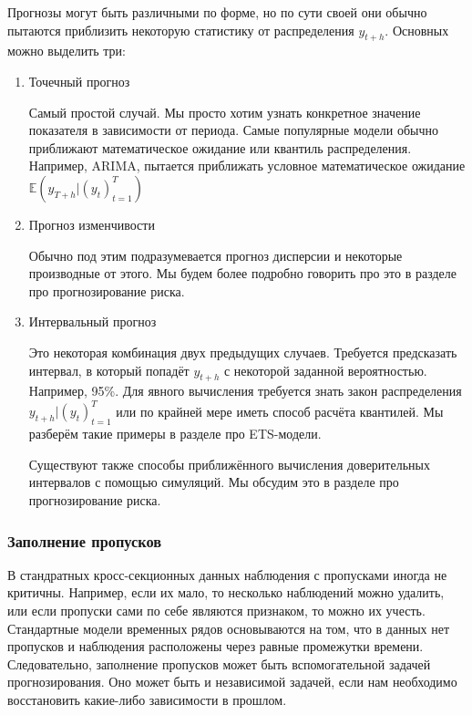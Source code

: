\documentclass[12pt,fleqn]{article}
\begin{document}
Прогнозы могут быть различными по форме, но по сути своей они обычно пытаются приблизить некоторую статистику от распределения $y_{t+h}$. Основных можно выделить три:

\begin{enumerate}
	\item Точечный прогноз
	
	Самый простой случай. Мы просто хотим узнать конкретное значение показателя в зависимости от периода. Самые популярные модели обычно приближают математическое ожидание или квантиль распределения. Например, ARIMA, пытается приближать условное математическое ожидание $\mathbb{E}(y_{T+h} | (y_t)_{t=1}^{T})$	
	
	
	\item Прогноз изменчивости
	
	Обычно под этим подразумевается прогноз дисперсии и некоторые производные от этого. Мы будем более подробно говорить про это в разделе про прогнозирование риска.
	
	\item Интервальный прогноз
	
	Это некоторая комбинация двух предыдущих случаев. Требуется предсказать интервал, в который попадёт $y_{t+h}$ с некоторой заданной вероятностью. Например, 95\%. Для явного вычисления требуется знать закон распределения $y_{t+h}  | (y_t)_{t=1}^{T}$ или по крайней мере иметь способ расчёта квантилей. Мы разберём такие примеры в разделе про ETS-модели. 
	
	Существуют также способы приближённого вычисления доверительных интервалов с помощью симуляций. Мы обсудим это в разделе про прогнозирование риска.
	
\end{enumerate}

\subsubsection{Заполнение пропусков}

В стандратных кросс-секционных данных наблюдения с пропусками иногда не критичны. Например, если их мало, то несколько наблюдений можно удалить, или если пропуски сами по себе являются признаком, то можно их учесть. Стандартные модели временных рядов основываются на том, что в данных нет пропусков и наблюдения расположены через равные промежутки времени. Следовательно, заполнение пропусков может быть вспомогательной задачей прогнозирования. Оно может быть и независимой задачей, если нам необходимо восстановить какие-либо зависимости в прошлом.
\end{document}
